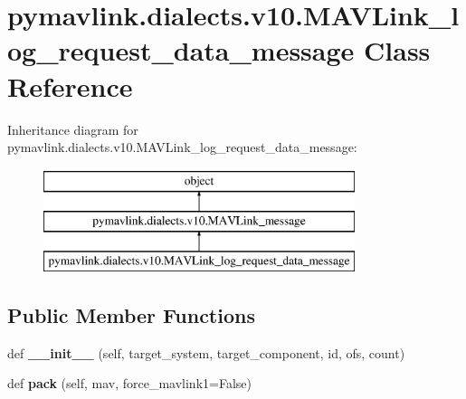 \hypertarget{classpymavlink_1_1dialects_1_1v10_1_1MAVLink__log__request__data__message}{}\section{pymavlink.\+dialects.\+v10.\+M\+A\+V\+Link\+\_\+log\+\_\+request\+\_\+data\+\_\+message Class Reference}
\label{classpymavlink_1_1dialects_1_1v10_1_1MAVLink__log__request__data__message}
Inheritance diagram for pymavlink.\+dialects.\+v10.\+M\+A\+V\+Link\+\_\+log\+\_\+request\+\_\+data\+\_\+message\+:\begin{figure}[H]
\begin{center}
\leavevmode
\includegraphics[height=3.000000cm]{classpymavlink_1_1dialects_1_1v10_1_1MAVLink__log__request__data__message}
\end{center}
\end{figure}
\subsection*{Public Member Functions}
\begin{DoxyCompactItemize}
\item 
\mbox{\label{classpymavlink_1_1dialects_1_1v10_1_1MAVLink__log__request__data__message_ada1f7521f60ab537ba304b45168356c7}} 
def {\bfseries \+\_\+\+\_\+init\+\_\+\+\_\+} (self, target\+\_\+system, target\+\_\+component, id, ofs, count)
\item 
\mbox{\label{classpymavlink_1_1dialects_1_1v10_1_1MAVLink__log__request__data__message_ab4782e3304ff0cfd6e4d951cc70bb55d}} 
def {\bfseries pack} (self, mav, force\+\_\+mavlink1=False)
\end{DoxyCompactItemize}
